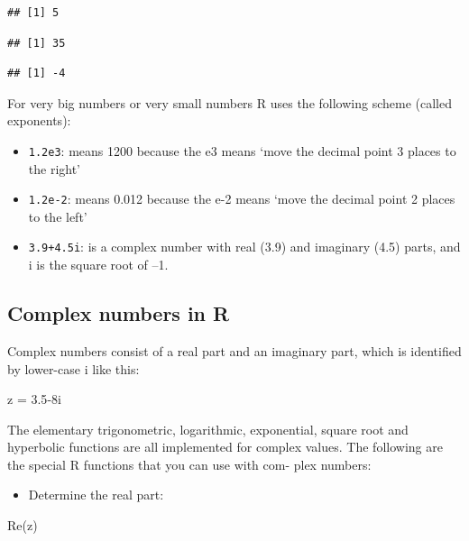 \documentclass[
]{book}
\newenvironment{Shaded}{\begin{snugshade}}{\end{snugshade}}
\newcommand{\FloatTok}[1]{\textcolor[rgb]{0.00,0.00,0.81}{#1}}
\newcommand{\FunctionTok}[1]{\textcolor[rgb]{0.00,0.00,0.00}{#1}}
\newcommand{\NormalTok}[1]{#1}
\newcommand{\OtherTok}[1]{\textcolor[rgb]{0.56,0.35,0.01}{#1}}
\newcommand{\SpecialCharTok}[1]{\textcolor[rgb]{0.00,0.00,0.00}{#1}}
\providecommand{\tightlist}{%
  \setlength{\itemsep}{0pt}\setlength{\parskip}{0pt}}
\begin{document}
\begin{verbatim}
## [1] 5
\end{verbatim}

\begin{verbatim}
## [1] 35
\end{verbatim}

\begin{verbatim}
## [1] -4
\end{verbatim}

For very big numbers or very small numbers R uses the following scheme (called exponents):

\begin{itemize}
\tightlist
\item
  \texttt{1.2e3}: means 1200 because the e3 means `move the decimal point 3 places to the right'
\item
  \texttt{1.2e-2}: means 0.012 because the e-2 means `move the decimal point 2 places to the left'
\item
  \texttt{3.9+4.5i}: is a complex number with real (3.9) and imaginary (4.5) parts, and i is the square root of --1.
\end{itemize}

\hypertarget{complex-numbers-in-r}{%
\subsection{Complex numbers in R}\label{complex-numbers-in-r}}

Complex numbers consist of a real part and an imaginary part, which is identified by lower-case i like this:

\begin{Shaded}
\begin{Highlighting}[]
\NormalTok{z }\OtherTok{=} \FloatTok{3.5}\SpecialCharTok{{-}}\NormalTok{8i}
\end{Highlighting}
\end{Shaded}

The elementary trigonometric, logarithmic, exponential, square root and hyperbolic functions are all
implemented for complex values. The following are the special R functions that you can use with com-
plex numbers:

\begin{itemize}
\tightlist
\item
  Determine the real part:
\end{itemize}

\begin{Shaded}
\begin{Highlighting}[]
\FunctionTok{Re}\NormalTok{(z)}
\end{Highlighting}
\end{Shaded}
\end{document}

